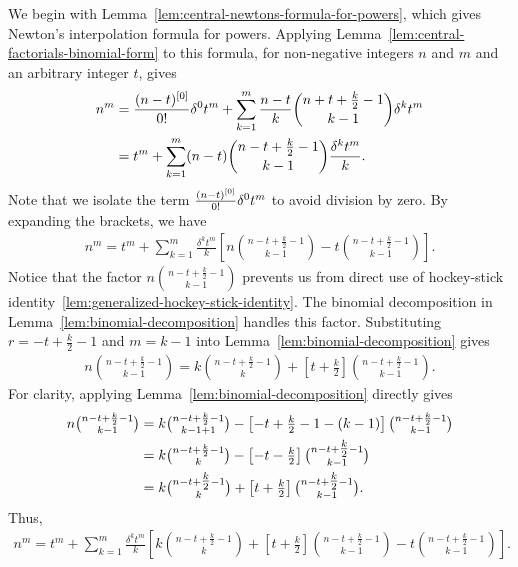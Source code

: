 We begin with Lemma~\eqref{lem:central-newtons-formula-for-powers}, which gives Newton's interpolation formula for powers.
Applying Lemma~\eqref{lem:central-factorials-binomial-form} to this formula, for non-negative integers $n$ and $m$ and an arbitrary integer $t$, gives
\begin{align*}
  n^m
  &= \frac{(n-t)^{[0]}}{0!} \delta^{0} t^m
  + \sum_{k=1}^{m} \frac{n-t}{k} \binom{n+t+\frac{k}{2}-1}{k-1} \delta^{k} t^m \\
  &= t^m + \sum_{k=1}^{m} (n-t) \binom{n-t+\frac{k}{2}-1}{k-1} \frac{\delta^{k} t^m}{k}.
\end{align*}
Note that we isolate the term $\frac{(n-t)^{[0]}}{0!} \delta^{0} t^m$
to avoid division by zero.
By expanding the brackets, we have
\begin{align*}
  n^m
  = t^m + \sum_{k=1}^{m} \frac{\delta^{k} t^m}{k}
  \left[
    n\binom{n-t+\frac{k}{2}-1}{k-1}
    -
    t\binom{n-t+\frac{k}{2}-1}{k-1}
  \right].
\end{align*}
Notice that the factor $n\binom{n-t+\frac{k}{2}-1}{k-1}$ prevents us from direct
use of hockey-stick identity~\eqref{lem:generalized-hockey-stick-identity}.
The binomial decomposition in Lemma~\eqref{lem:binomial-decomposition}
handles this factor.
Substituting $r=-t+\frac{k}{2}-1$ and $m=k-1$ into
Lemma~\eqref{lem:binomial-decomposition} gives
\begin{align*}
  n \binom{n-t+\frac{k}{2} -1}{k-1}
  = k \binom{n-t+\frac{k}{2}-1}{k}
  + \left [t+\frac{k}{2} \right ]
  \binom{n-t+\frac{k}{2}-1}{k-1}.
\end{align*}
For clarity, applying Lemma~\eqref{lem:binomial-decomposition} directly gives
\begin{align*}
  n \tbinom{n-t+\frac{k}{2} -1}{k-1}
  &=
  k \tbinom{n-t+\frac{k}{2} -1}{k-1+1}
  - \left [-t+\tfrac{k}{2} -1-(k-1)\right ]
  \tbinom{n-t+\frac{k}{2} -1}{k-1} \\
  &= k \tbinom{n-t+\frac{k}{2}-1}{k}
  - \left [-t-\tfrac{k}{2} \right ]
  \tbinom{n-t+\tfrac{k}{2}-1}{k-1} \\
  &= k \tbinom{n-t+\tfrac{k}{2}-1}{k}
  + \left [t+\tfrac{k}{2} \right ]
  \tbinom{n-t+\tfrac{k}{2}-1}{k-1}.
\end{align*}
Thus,
\begin{align*}
  n^m
  = t^m
  + \sum_{k=1}^{m} \frac{\delta^{k} t^m}{k}
  \left[
    k \binom{n-t+\frac{k}{2}-1}{k}
    +
    \left[t+\frac{k}{2} \right]
    \binom{n-t+\frac{k}{2}-1}{k-1}
    -
    t \binom{n-t+\frac{k}{2}-1}{k-1}
  \right].
\end{align*}
